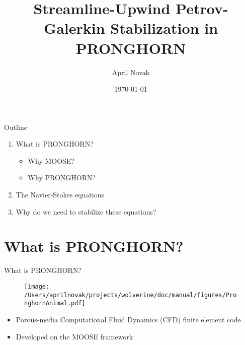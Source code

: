 \documentclass{beamer}
\title[PRONGHORN]{Streamline-Upwind Petrov-Galerkin Stabilization in PRONGHORN}
\author{April Novak}
\institute{UC Berkeley}
\date{\today}
\begin{document}
\begin{frame}
  \titlepage
\end{frame}

\begin{frame}{Outline}
\begin{enumerate}
\item What is PRONGHORN?
	\begin{itemize}
		\item Why MOOSE?
		\item Why PRONGHORN?
	\end{itemize}
\item The Navier-Stokes equations
\item Why do we need to stabilize these equations?
\end{enumerate}
\end{frame}

\section{What is PRONGHORN?}

\begin{frame}{What is PRONGHORN?}

\begin{figure}[H]
\centering
\texttt{[image: /Users/aprilnovak/projects/wolverine/doc/manual/figures/PronghornAnimal.pdf]}
\end{figure}

\begin{itemize}
  \item Porous-media Computational Fluid Dynamics (CFD) finite element code
  \item Developed on the MOOSE framework
\end{itemize}

\end{frame}

\end{document}
